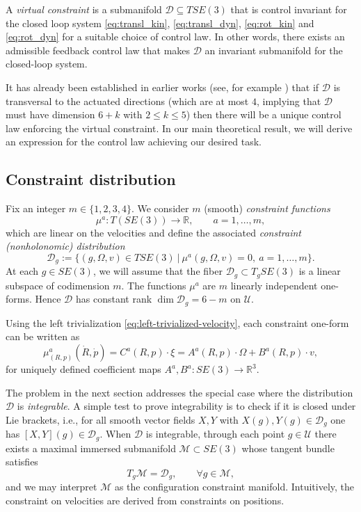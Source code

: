 \documentclass[letterpaper, 10 pt, conference]{ieeeconf}
\newcommand{\D}{\mathcal{D}}
\newcommand{\R}{\mathbb{R}}
\begin{document}
A \textit{virtual constraint} is a submanifold $\D\subseteq TSE(3)$ that is control invariant for the closed loop system \eqref{eq:transl_kin}, \eqref{eq:transl_dyn}, \eqref{eq:rot_kin} and \eqref{eq:rot_dyn} for a suitable choice of control law. In other words, there exists an admissible feedback control law that makes $\mathcal{D}$ an invariant submanifold for the closed-loop system.

It has already been established in earlier works (see, for example \cite{Simoes:linear:nonholonomic, stratoglou2024geometry}) that if $\D$ is transversal to the actuated directions (which are at most $4$, implying that $\D$ must have dimension $6+k$ with $2 \leqslant k \leqslant 5$) then there will be a unique control law enforcing the virtual constraint. In our main theoretical result, we will derive an expression for the control law achieving our desired task.


\subsection{Constraint distribution}
Fix an integer $m\in\{1,2,3,4\}$. We consider $m$ (smooth) \emph{constraint functions}
\begin{equation*}
\mu^a :T(SE(3))\to \R,\qquad a=1,\dots,m,
\end{equation*}
which are linear on the velocities and define the associated \emph{constraint (nonholonomic) distribution}
\begin{equation*}
\D_{g} := \{(g,\Omega, v)\in TSE(3) \ | \ \mu^{a}(g,\Omega, v)=0, \ a=1,\ldots, m\}.
\end{equation*}
At each $g\in SE(3)$, we will assume that the fiber $\D_g\subset T_g SE(3)$ is a linear subspace of codimension $m$. The functions $\mu^{a}$ are $m$ linearly independent one-forms. Hence $\D$ has constant rank $\dim \D_{g} = 6-m$ on $\mathcal{U}$.

Using the left trivialization \eqref{eq:left-trivialized-velocity}, each constraint one-form can be written as
\begin{equation}\label{eq:alpha-body-form}
\mu^a_{(R,p)}(\dot R,\dot p)= C^{a}(R,p) \cdot \xi = A^a(R,p)\cdot \Omega + B^a(R,p)\cdot v,
\end{equation}
for uniquely defined coefficient maps $A^a,B^a:SE(3)\to\mathbb{R}^3$.

The problem in the next section addresses the special case where the distribution $\D$ is \emph{integrable}. A simple test to prove integrability is to check if it is closed under Lie brackets, i.e., for all smooth vector fields $X,Y$ with $X(g),Y(g)\in\D_g$ one has $[X,Y](g)\in\D_g$.
When $\D$ is integrable, through each point $g\in\mathcal{U}$ there exists a maximal immersed submanifold
$\mathcal{M}\subset SE(3)$ whose tangent bundle satisfies
\[
T_g\mathcal{M}=\D_g,\qquad \forall g\in\mathcal{M},
\]
and we may interpret $\mathcal{M}$ as the configuration constraint manifold. Intuitively, the constraint on velocities are derived from constraints on positions.
\end{document}
